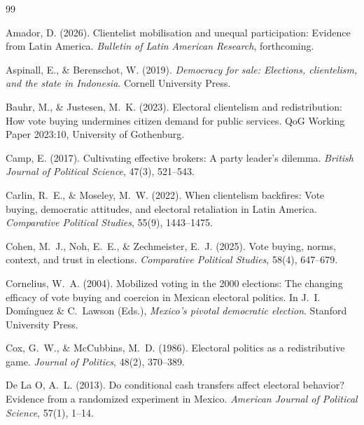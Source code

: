 \documentclass[12pt,letterpaper]{article}
\begin{document}
\newpage
\begin{thebibliography}{99}

Amador, D. (2026). Clientelist mobilisation and unequal participation: Evidence from Latin America. \textit{Bulletin of Latin American Research}, forthcoming.

Aspinall, E., \& Berenschot, W. (2019). \textit{Democracy for sale: Elections, clientelism, and the state in Indonesia}. Cornell University Press.

Bauhr, M., \& Justesen, M.~K. (2023). Electoral clientelism and redistribution: How vote buying undermines citizen demand for public services. QoG Working Paper 2023:10, University of Gothenburg.

Camp, E. (2017). Cultivating effective brokers: A party leader's dilemma. \textit{British Journal of Political Science}, 47(3), 521--543.

Carlin, R.~E., \& Moseley, M.~W. (2022). When clientelism backfires: Vote buying, democratic attitudes, and electoral retaliation in Latin America. \textit{Comparative Political Studies}, 55(9), 1443--1475.

Cohen, M.~J., Noh, E.~E., \& Zechmeister, E.~J. (2025). Vote buying, norms, context, and trust in elections. \textit{Comparative Political Studies}, 58(4), 647--679.

Cornelius, W.~A. (2004). Mobilized voting in the 2000 elections: The changing efficacy of vote buying and coercion in Mexican electoral politics. In J.~I. Dom\'{i}nguez \& C.~Lawson (Eds.), \textit{Mexico's pivotal democratic election}. Stanford University Press.

Cox, G.~W., \& McCubbins, M.~D. (1986). Electoral politics as a redistributive game. \textit{Journal of Politics}, 48(2), 370--389.

De La O, A.~L. (2013). Do conditional cash transfers affect electoral behavior? Evidence from a randomized experiment in Mexico. \textit{American Journal of Political Science}, 57(1), 1--14.


\end{thebibliography}
\end{document}
